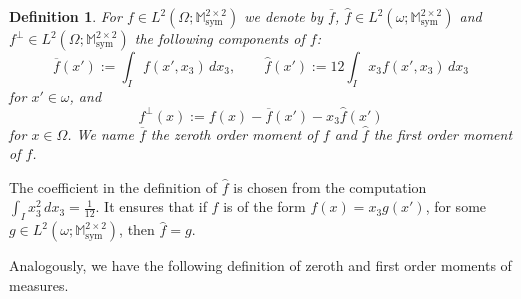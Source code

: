\documentclass[reqno,10pt]{amsart}
\numberwithin{equation}{section}
\newtheorem{definition}[theorem]{Definition}
\theoremstyle{remark}
\newcommand{\M}{\mathbb{M}}
\DeclareMathOperator{\sym}{sym}
\newcommand{\zerothI}[1]{\overline{#1}}
\newcommand{\firstI}[1]{\widehat{#1}}
\begin{document}
\begin{definition} \label{moments of functions}
	For $f \in L^2(\Omega;\M^{2 \times 2}_{\sym})$ we denote by $\zerothI{f}$, $\firstI{f} \in L^2(\omega;\M^{2 \times 2}_{\sym})$ and $f^\perp \in L^2(\Omega;\M^{2 \times 2}_{\sym})$ the following components of $f$:
	\begin{equation*}
		\zerothI{f}(x')
		:= \int_{I} f(x',x_3)\, dx_3, \qquad
		\firstI{f}(x')
		:= 12 \int_{I} x_3 f(x',x_3)\,dx_3
	\end{equation*}
	for $x' \in \omega$, and
	\begin{equation*}
		f^\perp(x) := f(x) 
		- \zerothI{f}(x') - x_3 \firstI{f}(x')
	\end{equation*}
	for $x \in \Omega$.
	We name $\zerothI{f}$ the \emph{zeroth order moment} of $f$ and $\firstI{f}$ the \emph{first order moment} of $f$.
\end{definition}
The coefficient in the definition of $\firstI{f}$ is chosen from the computation $\int_{I} x_3^2 \,dx_3 = \frac{1}{12}$. 
It ensures that if $f$ is of the form $f(x) = x_3 g(x')$, for some $g \in L^2(\omega;\M^{2 \times 2}_{\sym})$, then $\firstI{f} = g$.


Analogously, we have the following definition of zeroth and first order moments of measures. 
\end{document}
